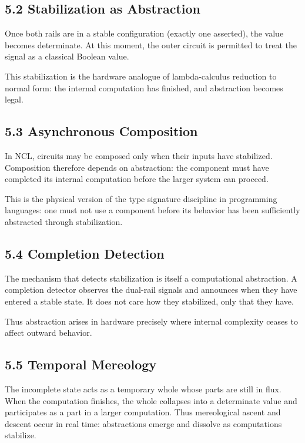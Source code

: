\documentclass[12pt,letterpaper]{article}
\begin{document}
\subsection{5.2 Stabilization as Abstraction}

Once both rails are in a stable configuration (exactly one asserted), the value becomes determinate. At this moment, the outer circuit is permitted to treat the signal as a classical Boolean value.

This stabilization is the hardware analogue of lambda-calculus reduction to normal form: the internal computation has finished, and abstraction becomes legal.

\subsection{5.3 Asynchronous Composition}

In NCL, circuits may be composed only when their inputs have stabilized. Composition therefore depends on abstraction: the component must have completed its internal computation before the larger system can proceed.

This is the physical version of the type signature discipline in programming languages: one must not use a component before its behavior has been sufficiently abstracted through stabilization.

\subsection{5.4 Completion Detection}

The mechanism that detects stabilization is itself a computational abstraction. A completion detector observes the dual-rail signals and announces when they have entered a stable state. It does not care how they stabilized, only that they have.

Thus abstraction arises in hardware precisely where internal complexity ceases to affect outward behavior.

\subsection{5.5 Temporal Mereology}

The incomplete state acts as a temporary whole whose parts are still in flux. When the computation finishes, the whole collapses into a determinate value and participates as a part in a larger computation. Thus mereological ascent and descent occur in real time: abstractions emerge and dissolve as computations stabilize.
\end{document}
